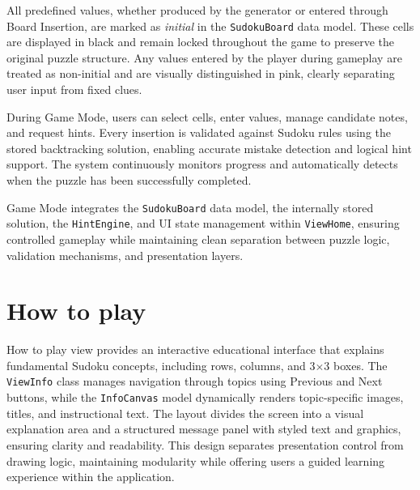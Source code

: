\documentclass[12pt,a4paper]{article}
\begin{document}
All predefined values, whether produced by the generator or entered through Board Insertion, are marked as \textit{initial} in the \texttt{SudokuBoard} data model. These cells are displayed in black and remain locked throughout the game to preserve the original puzzle structure. Any values entered by the player during gameplay are treated as non-initial and are visually distinguished in pink, clearly separating user input from fixed clues.

During Game Mode, users can select cells, enter values, manage candidate notes, and request hints. Every insertion is validated against Sudoku rules using the stored backtracking solution, enabling accurate mistake detection and logical hint support. The system continuously monitors progress and automatically detects when the puzzle has been successfully completed.

Game Mode integrates the \texttt{SudokuBoard} data model, the internally stored solution, the \texttt{HintEngine}, and UI state management within \texttt{ViewHome}, ensuring controlled gameplay while maintaining clean separation between puzzle logic, validation mechanisms, and presentation layers.

\section{How to play}
How to play view provides an interactive educational interface that explains fundamental Sudoku concepts, including rows, columns, and 3$\times$3 boxes. The \texttt{ViewInfo} class manages navigation through topics using Previous and Next buttons, while the \texttt{InfoCanvas} model dynamically renders topic-specific images, titles, and instructional text. The layout divides the screen into a visual explanation area and a structured message panel with styled text and graphics, ensuring clarity and readability. This design separates presentation control from drawing logic, maintaining modularity while offering users a guided learning experience within the application.
\end{document}
